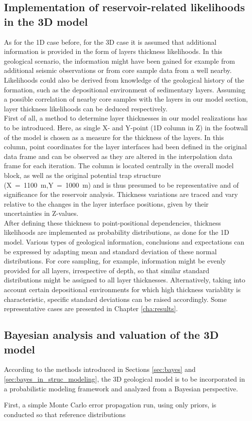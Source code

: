 		\subsection{Implementation of reservoir-related likelihoods in the 3D model}
		As for the 1D case before, for the 3D case it is assumed that additional information is provided in the form of layers thickness likelihoods. In this geological scenario, the information might have been gained for example from additional seismic observations or from core sample data from a well nearby. Likelihoods could also be derived from knowledge of the geological history of the formation, such as the depositional environment of sedimentary layers. Assuming a possible correlation of nearby core samples with the layers in our model section, layer thickness likelihoods can be deduced respectively.\\
		First of all, a method to determine layer thicknesses in our model realizations has to be introduced. Here, as single X- and Y-point (1D column in Z) in the footwall of the model is chosen as a measure for the thickness of the layers. In this column, point coordinates for the layer interfaces had been defined in the original data frame and can be observed as they are altered in the interpolation data frame for each iteration. The column is located centrally in the overall model block, as well as the original potential trap structure (X~=~1100~m,Y~=~1000~m) and is thus presumed to be representative and of significance for the reservoir analysis. Thickness variations are traced and vary relative to the changes in the layer interface positions, given by their uncertainties in Z-values.\\
		After defining these thickness to point-positional dependencies, thickness likelihoods are implemented as probability distributions, as done for the 1D model. Various types of geological information, conclusions and expectations can be expressed by adapting mean and standard deviation of these normal distributions. For core sampling, for example, information might be evenly provided for all layers, irrespective of depth, so that similar standard distributions might be assigned to all layer thicknesses. Alternatively, taking into account certain depositional environments for which high thickness variablity is characteristic, specific standard deviations can be raised accordingly. Some representative cases are presented in Chapter \ref{cha:results}.
		
		\subsection{Bayesian analysis and valuation of the 3D model}
		According to the methods introduced in Sections \ref{sec:bayes} and \ref{sec:bayes_in_struc_modeling}, the 3D geological model is to be incorporated in a probabilistic modeling framework and analyzed from a Bayesian perspective.
		
		First, a simple Monte Carlo error propagation run, using only priors, is conducted so that reference distributions 